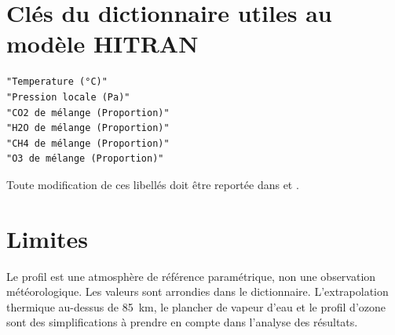 \documentclass[11pt,a4paper]{article}
\begin{document}
\section{Clés du dictionnaire utiles au modèle HITRAN}

\begin{lstlisting}
"Temperature (°C)"
"Pression locale (Pa)"
"CO2 de mélange (Proportion)"
"H2O de mélange (Proportion)"
"CH4 de mélange (Proportion)"
"O3 de mélange (Proportion)"
\end{lstlisting}

Toute modification de ces libellés doit être reportée dans
 et
.

\section{Limites}

Le profil est une atmosphère de référence paramétrique, non une observation
météorologique. Les valeurs sont arrondies dans le dictionnaire. L'extrapolation
thermique au-dessus de \SI{85}{\kilo\metre}, le plancher de vapeur d'eau et le
profil d'ozone sont des simplifications à prendre en compte dans l'analyse des
résultats.
\end{document}
